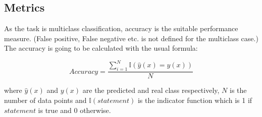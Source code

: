 \subsection{Metrics}

As the task is multiclass classification, accuracy is the suitable performance measure. (False positive, False negative etc. is not defined for the multiclass case.) The accuracy is going to be calculated with the usual formula:

$$Accuracy = \frac{\sum_{i=1}^{N}\mathbb{I}\left(\hat{y}(x) = y(x)\right)}{N}$$

where $\hat{y}(x)$ and $y(x)$ are the predicted and real class respectively, $N$ is the number of data points and $\mathbb{I}(statement)$ is the indicator function which is 1 if $statement$ is true and 0 otherwise.